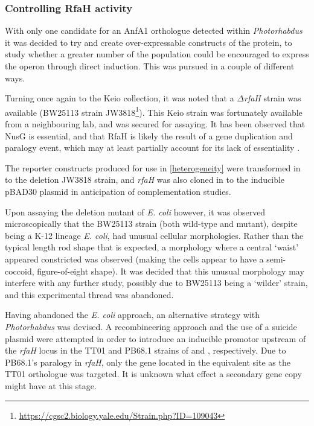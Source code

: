 \clearpage
\subsubsection{Controlling RfaH activity}
With only one candidate for an AnfA1 orthologue detected within \emph{Photorhabdus} it was decided to try and create over-expressable constructs of the protein, to study whether a greater number of the population could be encouraged to express the operon through direct induction. This was pursued in a couple of different ways.

Turning once again to the Keio collection, it was noted that a $\Delta$\emph{rfaH} strain was available (BW25113 strain JW3818\footnote{\url{https://cgsc2.biology.yale.edu/Strain.php?ID=109043}})\citep{Baba2006}. This Keio strain was fortunately available from a neighbouring lab, and was secured for assaying. It has been observed that NusG is essential, and that RfaH is likely the result of a gene duplication and paralogy event, which may at least partially account for its lack of essentiality \citep{Belogurov2007}.

The reporter constructs produced for use in \vref{heterogeneity} were transformed in to the deletion JW3818 strain, and \emph{rfaH} was also cloned in to the inducible pBAD30 plasmid in anticipation of complementation studies.

Upon assaying the deletion mutant of \emph{E. coli} however, it was observed microscopically that the BW25113 strain (both wild-type and mutant), despite being a K-12 lineage \emph{E. coli}, had unusual cellular morphologies. Rather than the typical length rod shape that is expected, a morphology where a central `waist' appeared constricted was observed (making the cells appear to have a semi-coccoid, figure-of-eight shape). It was decided that this unusual morphology may interfere with any further study, possibly due to BW25113 being a `wilder' strain, and this experimental thread was abandoned.

Having abandoned the \emph{E. coli} approach, an alternative strategy with \emph{Photorhabdus} was devised. A recombineering approach and the use of a suicide plasmid were attempted in order to introduce an inducible promotor upstream of the \emph{rfaH} locus in the TT01 and PB68.1 strains of \Plum{} and \Pasy, respectively. Due to \Pasy{} PB68.1's paralogy in \emph{rfaH}, only the gene located in the equivalent site as the TT01 orthologue was targeted. It is unknown what effect a secondary gene copy might have at this stage.

